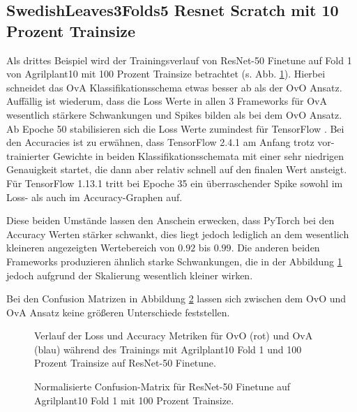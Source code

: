 \subsection{SwedishLeaves3Folds5 Resnet Scratch mit 10 Prozent Trainsize}
Als drittes Beispiel wird der Trainingsverlauf von ResNet-50 Finetune auf Fold 1 von Agrilplant10 mit 100 Prozent Trainsize betrachtet (s. Abb. \ref{fig:TrainingsverlaufC}).
Hierbei schneidet das OvA Klassifikationsschema etwas besser ab als der OvO Ansatz. Auffällig ist wiederum, dass die Loss Werte in allen 3 Frameworks für OvA wesentlich stärkere Schwankungen und Spikes bilden als bei dem OvO Ansatz. Ab Epoche 50 stabilisieren sich die Loss Werte zumindest für TensorFlow \cite{tensorflow}.
Bei den Accuracies ist zu erwähnen, dass TensorFlow \cite{tensorflow} 2.4.1 am Anfang trotz vor-trainierter Gewichte in beiden Klassifikationsschemata mit einer sehr niedrigen Genauigkeit startet, die dann aber relativ schnell auf den finalen Wert ansteigt. Für TensorFlow \cite{tensorflow} 1.13.1 tritt bei Epoche 35 ein überraschender Spike sowohl im Loss- als auch im Accuracy-Graphen auf.

Diese beiden Umstände lassen den Anschein erwecken, dass PyTorch \cite{pytorch} bei den Accuracy Werten stärker schwankt, dies liegt jedoch lediglich an dem wesentlich kleineren angezeigten Wertebereich von $0.92$ bis $0.99$. Die anderen beiden Frameworks produzieren ähnlich starke Schwankungen, die in der Abbildung \ref{fig:TrainingsverlaufC} jedoch aufgrund der Skalierung wesentlich kleiner wirken.

Bei den Confusion Matrizen in Abbildung \ref{fig:ConfusionMatrixC} lassen sich zwischen dem OvO und OvA Ansatz keine größeren Unterschiede feststellen.
\label{ch:BeispielC}
\begin{figure}[H]
\begin{adjustbox}{width=1.4\textwidth, center}

\end{adjustbox}
\caption{Verlauf der Loss und Accuracy Metriken für OvO (rot) und OvA (blau) während des Trainings mit Agrilplant10 Fold 1 und 100 Prozent Trainsize auf ResNet-50 Finetune.}
\label{fig:TrainingsverlaufC}
\end{figure}

\begin{figure}[H]
\begin{adjustbox}{width=1.1\textwidth, center}

\end{adjustbox}
\caption{Normalisierte Confusion-Matrix für ResNet-50 Finetune auf Agrilplant10 Fold 1 mit 100 Prozent Trainsize.}
\label{fig:ConfusionMatrixC}
\end{figure}

